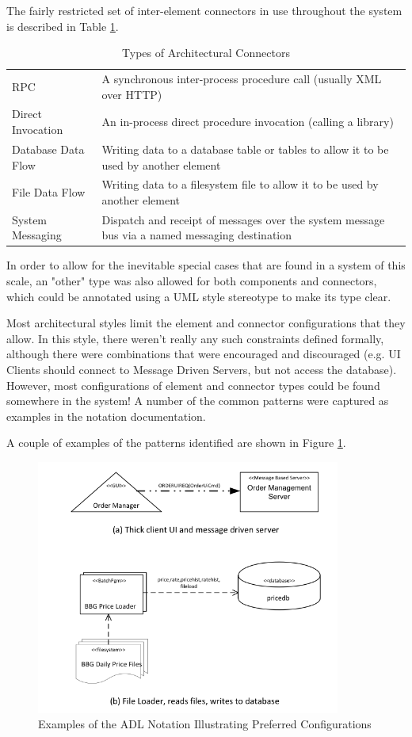 The fairly restricted set of inter-element connectors in use throughout the system is described in Table \ref{table:archconntypes}.


\begin{table}
\caption{Types of Architectural Connectors}
\label{table:archconntypes}
\footnotesize
\begin{tabular}{| l p{10cm} |}
\hline
RPC                & A synchronous inter-process procedure call (usually XML over HTTP) \\
Direct Invocation  & An in-process direct procedure invocation (calling a library) \\
Database Data Flow & Writing data to a database table or tables to allow it to be used by another element \\
File Data Flow     & Writing data to a filesystem file to allow it to be used by another element \\
System Messaging   &  Dispatch and receipt of messages over the system message bus via a named messaging destination \\
\hline
\end{tabular}
\end{table}

  In order to allow for the inevitable special cases that are found in a system of this scale, an "other" type was also allowed for both components and connectors, which could be annotated using a UML style stereotype to make its type clear.

  Most architectural styles limit the element and connector configurations that they allow.  In this style, there weren't really any such constraints defined formally, although there were combinations that were encouraged and discouraged (e.g. UI Clients should connect to Message Driven Servers, but not access the database).  However, most configurations of element and connector types could be found somewhere in the system! A number of the common patterns were captured as examples in the notation documentation.

  A couple of examples of the patterns identified are shown in Figure \ref{figure:adlnotation1}. 

\begin{figure}[h]
\centering
\includegraphics[width=10cm]{Figures/adls-figure1}
\caption{Examples of the ADL Notation Illustrating Preferred Configurations}
\label{figure:adlnotation1}
\end{figure}  

